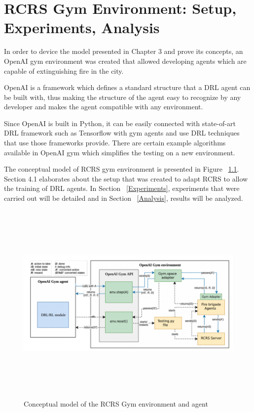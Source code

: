 \documentclass[12pt]{report}
\begin{document}
\chapter{RCRS Gym Environment: Setup, Experiments, Analysis}

In order to device the model presented in Chapter 3 and prove its concepts, an OpenAI gym environment \cite{brockman2016openai} was created that allowed developing agents which are capable of extinguishing fire in the city. 

OpenAI is a framework which defines a standard structure that a DRL agent can be built with, thus making the structure of the agent easy to recognize by any developer and makes the agent compatible with any environment. 

Since OpenAI is built in Python, it can be easily connected with state-of-art DRL framework such as Tensorflow \cite{Abadi} with gym agents and use DRL techniques that use those frameworks provide. There are certain example algorithms available in OpenAI gym which simplifies the testing on a new environment. 

The conceptual model of RCRS gym environment is presented in Figure ~\ref{fig:OpenAIgymRCRS}. Section 4.1 elaborates about the setup that was created to adapt RCRS to allow the training of DRL agents. In Section ~\ref{Experiments}, experiments that were carried out will be detailed and in Section ~\ref{Analysis}, results will be analyzed. 

\begin{figure}[!h]
    \centering
    \includegraphics[height=10cm, width=17cm]{OpenAIgymRCRS.png}
    \caption{Conceptual model of the RCRS Gym environment and agent}
    \label{fig:OpenAIgymRCRS}
\end{figure}
\end{document}

